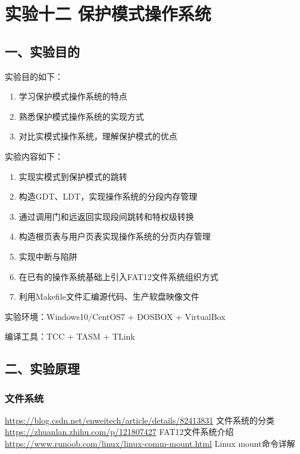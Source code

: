 \documentclass[12pt,a4paper,UTF8]{ctexart}
\begin{document}
\section*{实验十二 \quad 保护模式操作系统}

\subsection*{一、实验目的}

\noindent 实验目的如下：

\renewcommand{\labelenumi}{(\theenumi)}
\begin{enumerate}
\item 学习保护模式操作系统的特点
\item 熟悉保护模式操作系统的实现方式
\item 对比实模式操作系统，理解保护模式的优点
\end{enumerate}

\noindent 实验内容如下：

\begin{enumerate}
\item 实现实模式到保护模式的跳转
\item 构造GDT、LDT，实现操作系统的分段内存管理
\item 通过调用门和远返回实现段间跳转和特权级转换
\item 构造根页表与用户页表实现操作系统的分页内存管理
\item 实现中断与陷阱
\item 在已有的操作系统基础上引入FAT12文件系统组织方式
\item 利用Makefile文件汇编源代码、生产软盘映像文件
\end{enumerate}

\noindent 实验环境：Windows10/CentOS7 + DOSBOX + VirtualBox

\noindent 编译工具：TCC + TASM + TLink

\subsection*{二、实验原理}

\subsubsection*{文件系统}



\begin{thebibliography}{1}
 \href{https://blog.csdn.net/enweitech/article/details/82413831}
{https://blog.csdn.net/enweitech/article/details/82413831}
文件系统的分类
 \href{https://zhuanlan.zhihu.com/p/121807427}
{https://zhuanlan.zhihu.com/p/121807427}
FAT12文件系统介绍
 \href{https://www.runoob.com/linux/linux-comm-mount.html}
{https://www.runoob.com/linux/linux-comm-mount.html}
Linux mount命令详解
\end{thebibliography}
\end{document}
